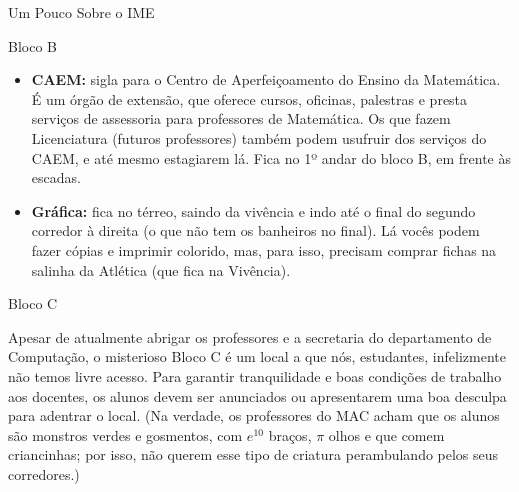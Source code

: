 \begin{secao}{Um Pouco Sobre o IME}
\begin{subsecao}{Bloco B}
\begin{itemize}
Neste ano, a Seção de Alunos nos informou
que o quadro de funcionários está bem reduzido, por isso, pedimos que:
\begin{itemize}
\item[-] Deem preferência ao uso do Sistema JupiterWeb (troquem conversas, ideias e informações com os colegas - um pode ajudar o outro)
\item[-] Evitem encaminhar mensagens por e-mail, pois devido a grande demanda de serviço, o retorno tem sido demorado.
\item[-] Evitem as ligações por telefone, pois a prioridade tem sido o andamento do serviço interno. 
\end{itemize}

\item {\bf CAEM:} sigla para o Centro de Aperfeiçoamento do Ensino da
  Matemática. É um órgão de extensão, que oferece cursos, oficinas, palestras e
  presta serviços de assessoria para professores de Matemática. Os que fazem
  Licenciatura (futuros professores) também podem usufruir dos serviços do CAEM,
  e até mesmo estagiarem lá. Fica no 1º andar do bloco B, em frente às escadas.

\item{\bf Gráfica:} fica no térreo, saindo da vivência e indo até o final do segundo
  corredor à direita (o que não tem os banheiros no final). Lá vocês podem fazer cópias
  e imprimir colorido, mas, para isso, precisam comprar fichas na salinha da Atlética 
  (que fica na Vivência).
\end{itemize}

\end{subsecao}






\begin{subsecao}{Bloco C}

Apesar de atualmente abrigar os professores e a secretaria do departamento de
Computação, o misterioso Bloco C é um local a que nós, estudantes, infelizmente não
temos livre acesso. Para garantir tranquilidade e boas condições de trabalho aos
docentes, os alunos devem ser anunciados ou apresentarem uma boa desculpa para
adentrar o local. (Na verdade, os professores do MAC acham que os alunos são monstros
verdes e gosmentos, com $e^{10}$ braços, $\pi$ olhos e que comem criancinhas;
por isso, não querem esse tipo de criatura perambulando pelos seus corredores.)


\end{subsecao}
\end{secao}
